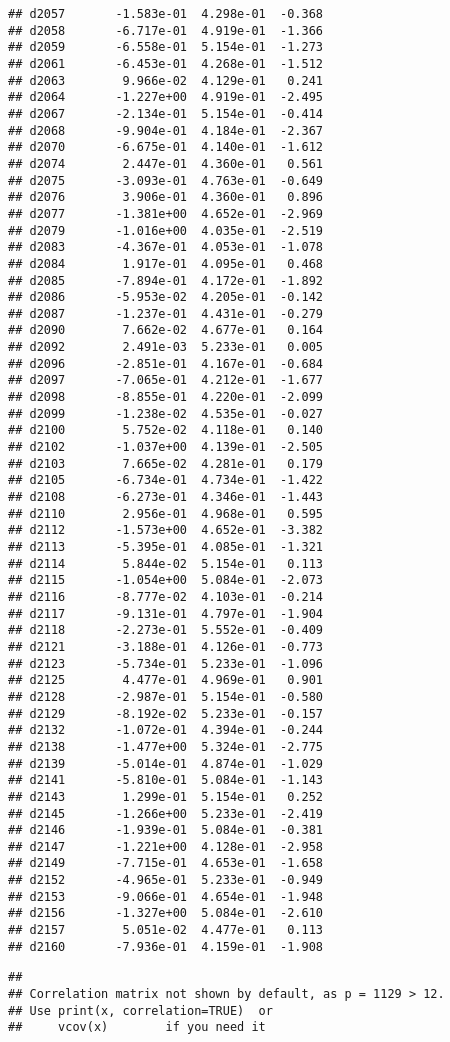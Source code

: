 \documentclass[
]{article}
\begin{document}
\begin{verbatim}
## d2057       -1.583e-01  4.298e-01  -0.368
## d2058       -6.717e-01  4.919e-01  -1.366
## d2059       -6.558e-01  5.154e-01  -1.273
## d2061       -6.453e-01  4.268e-01  -1.512
## d2063        9.966e-02  4.129e-01   0.241
## d2064       -1.227e+00  4.919e-01  -2.495
## d2067       -2.134e-01  5.154e-01  -0.414
## d2068       -9.904e-01  4.184e-01  -2.367
## d2070       -6.675e-01  4.140e-01  -1.612
## d2074        2.447e-01  4.360e-01   0.561
## d2075       -3.093e-01  4.763e-01  -0.649
## d2076        3.906e-01  4.360e-01   0.896
## d2077       -1.381e+00  4.652e-01  -2.969
## d2079       -1.016e+00  4.035e-01  -2.519
## d2083       -4.367e-01  4.053e-01  -1.078
## d2084        1.917e-01  4.095e-01   0.468
## d2085       -7.894e-01  4.172e-01  -1.892
## d2086       -5.953e-02  4.205e-01  -0.142
## d2087       -1.237e-01  4.431e-01  -0.279
## d2090        7.662e-02  4.677e-01   0.164
## d2092        2.491e-03  5.233e-01   0.005
## d2096       -2.851e-01  4.167e-01  -0.684
## d2097       -7.065e-01  4.212e-01  -1.677
## d2098       -8.855e-01  4.220e-01  -2.099
## d2099       -1.238e-02  4.535e-01  -0.027
## d2100        5.752e-02  4.118e-01   0.140
## d2102       -1.037e+00  4.139e-01  -2.505
## d2103        7.665e-02  4.281e-01   0.179
## d2105       -6.734e-01  4.734e-01  -1.422
## d2108       -6.273e-01  4.346e-01  -1.443
## d2110        2.956e-01  4.968e-01   0.595
## d2112       -1.573e+00  4.652e-01  -3.382
## d2113       -5.395e-01  4.085e-01  -1.321
## d2114        5.844e-02  5.154e-01   0.113
## d2115       -1.054e+00  5.084e-01  -2.073
## d2116       -8.777e-02  4.103e-01  -0.214
## d2117       -9.131e-01  4.797e-01  -1.904
## d2118       -2.273e-01  5.552e-01  -0.409
## d2121       -3.188e-01  4.126e-01  -0.773
## d2123       -5.734e-01  5.233e-01  -1.096
## d2125        4.477e-01  4.969e-01   0.901
## d2128       -2.987e-01  5.154e-01  -0.580
## d2129       -8.192e-02  5.233e-01  -0.157
## d2132       -1.072e-01  4.394e-01  -0.244
## d2138       -1.477e+00  5.324e-01  -2.775
## d2139       -5.014e-01  4.874e-01  -1.029
## d2141       -5.810e-01  5.084e-01  -1.143
## d2143        1.299e-01  5.154e-01   0.252
## d2145       -1.266e+00  5.233e-01  -2.419
## d2146       -1.939e-01  5.084e-01  -0.381
## d2147       -1.221e+00  4.128e-01  -2.958
## d2149       -7.715e-01  4.653e-01  -1.658
## d2152       -4.965e-01  5.233e-01  -0.949
## d2153       -9.066e-01  4.654e-01  -1.948
## d2156       -1.327e+00  5.084e-01  -2.610
## d2157        5.051e-02  4.477e-01   0.113
## d2160       -7.936e-01  4.159e-01  -1.908
\end{verbatim}

\begin{verbatim}
## 
## Correlation matrix not shown by default, as p = 1129 > 12.
## Use print(x, correlation=TRUE)  or
##     vcov(x)        if you need it
\end{verbatim}
\end{document}
